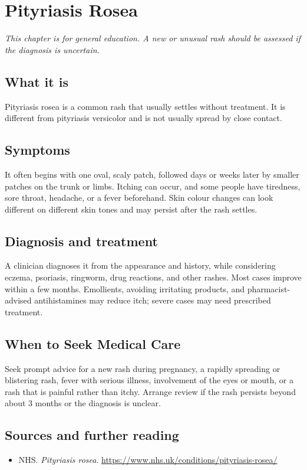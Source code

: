 \chapter{Pityriasis Rosea}

\medskip
\noindent\textit{This chapter is for general education. A new or unusual rash should be assessed if the diagnosis is uncertain.}

\section*{What it is}
Pityriasis rosea is a common rash that usually settles without treatment. It is different from pityriasis versicolor and is not usually spread by close contact.

\section*{Symptoms}
It often begins with one oval, scaly patch, followed days or weeks later by smaller patches on the trunk or limbs. Itching can occur, and some people have tiredness, sore throat, headache, or a fever beforehand. Skin colour changes can look different on different skin tones and may persist after the rash settles.

\section*{Diagnosis and treatment}
A clinician diagnoses it from the appearance and history, while considering eczema, psoriasis, ringworm, drug reactions, and other rashes. Most cases improve within a few months. Emollients, avoiding irritating products, and pharmacist-advised antihistamines may reduce itch; severe cases may need prescribed treatment.

\section*{When to Seek Medical Care}
Seek prompt advice for a new rash during pregnancy, a rapidly spreading or blistering rash, fever with serious illness, involvement of the eyes or mouth, or a rash that is painful rather than itchy. Arrange review if the rash persists beyond about 3 months or the diagnosis is unclear.

\section*{Sources and further reading}
\begin{itemize}
\item NHS. \textit{Pityriasis rosea}. \url{https://www.nhs.uk/conditions/pityriasis-rosea/}
\end{itemize}
